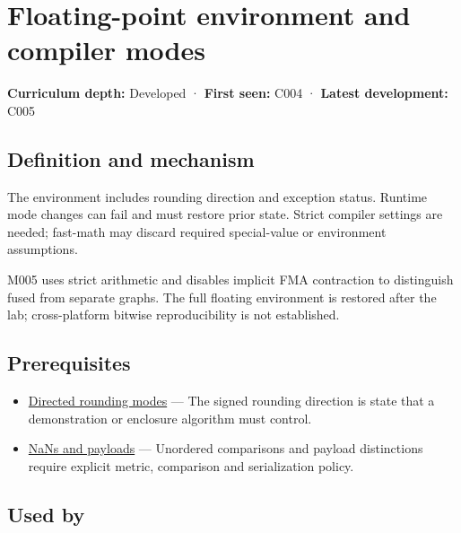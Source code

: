 \hypertarget{appendix-f11d1a521253}{}\label{referencestart:appendix-f11d1a521253}
\section{Floating-point environment and compiler modes}\label{appendix-f11d1a521253-floating-point-environment-and-compiler-modes}

\textbf{Curriculum depth:} Developed · \textbf{First seen:} C004 · \textbf{Latest development:} C005

\begin{allmightroledefinition}

\subsection{Definition and mechanism}\label{appendix-f11d1a521253-definition-and-mechanism}

The environment includes rounding direction and exception status. Runtime mode changes can fail and must restore prior state. Strict compiler settings are needed; fast-math may discard required special-value or environment assumptions.

\end{allmightroledefinition}

M005 uses strict arithmetic and disables implicit FMA contraction to distinguish fused from separate graphs. The full floating environment is restored after the lab; cross-platform bitwise reproducibility is not established.

\subsection{Prerequisites}\label{appendix-f11d1a521253-prerequisites}

\begin{itemize}
\tightlist
\item
  \hyperref[appendix-637d164ae5ca]{Directed rounding modes} --- The signed rounding direction is state that a demonstration or enclosure algorithm must control.
\item
  \hyperref[appendix-d6607cc4c235]{NaNs and payloads} --- Unordered comparisons and payload distinctions require explicit metric, comparison and serialization policy.
\end{itemize}

\subsection{Used by}\label{appendix-f11d1a521253-used-by}


